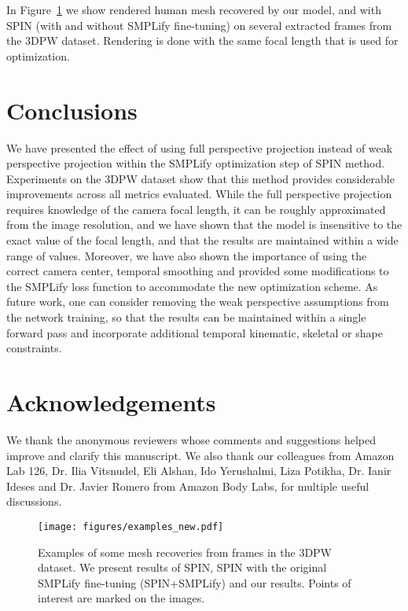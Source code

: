 \documentclass[runningheads]{llncs}
\begin{document}
In Figure~\ref{fig:examples} we show rendered human mesh recovered by our model, and with SPIN (with and without SMPLify fine-tuning) on several extracted frames from the 3DPW dataset. Rendering is done with the same focal length that is used for optimization.


\section{Conclusions}

We have presented the effect of using full perspective projection instead of weak perspective projection within the SMPLify optimization step of SPIN method. Experiments on the 3DPW dataset show that this method provides considerable improvements across all metrics evaluated. While the full perspective projection requires knowledge of the camera focal length, it can be roughly approximated from the image resolution, and we have shown that the model is insensitive to the exact value of the focal length, and that the results are maintained within a wide range of values. Moreover, we have also shown the importance of using the correct camera center, temporal smoothing and provided some modifications to the SMPLify loss function to accommodate the new optimization scheme. As future work, one can consider removing the weak perspective assumptions from the network training, so that the results can be maintained within a single forward pass and incorporate additional temporal kinematic, skeletal or shape constraints.

\section*{Acknowledgements}

We thank the anonymous reviewers whose comments and suggestions helped improve and clarify this manuscript. We also thank our colleagues from Amazon Lab 126,  Dr. Ilia Vitsnudel, Eli Alshan, Ido Yerushalmi, Liza Potikha, Dr. Ianir Ideses and Dr. Javier Romero from Amazon Body Labs, for multiple useful discussions.     

\begin{figure}
	\texttt{[image: figures/examples\_new.pdf]}
	\centering
	\caption{Examples of some mesh recoveries from frames in the 3DPW dataset. We present results of SPIN, SPIN with the original SMPLify fine-tuning (SPIN+SMPLify) and our results. Points of interest are marked on the images.}
	\label{fig:examples}
\end{figure}



\end{document}
